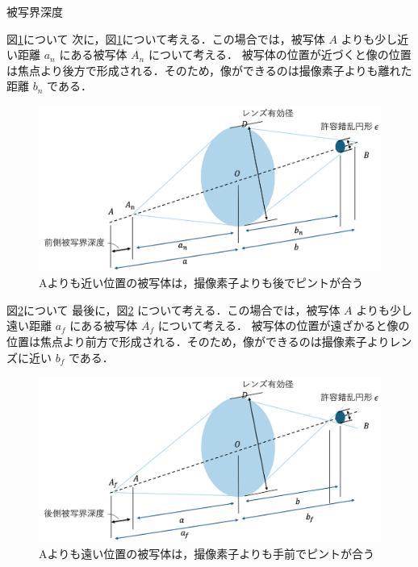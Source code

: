 \documentclass[8pt, jfont=ipaexm, t]{beamer} %
\begin{document}
\begin{frame}[allowframebreaks]{被写界深度}
  \newpage
  \begin{block}{図\ref{fig:b}について}
    次に，図\ref{fig:b}について考える．この場合では，被写体 $A$ よりも少し近い距離 $a_n$ にある被写体 $A_n$ について考える．
    被写体の位置が近づくと像の位置は焦点より後方で形成される．そのため，像ができるのは撮像素子よりも離れた距離 $b_n$ である．
\end{block}
  \begin{figure}[H]
    \centering
    \includegraphics[scale=0.35]{figure/07.png}
    \caption{Aよりも近い位置の被写体は，撮像素子よりも後でピントが合う}
    \label{fig:b}
  \end{figure}
\newpage
  \begin{block}{図\ref{fig:c}について}
    最後に，図\ref{fig:c} について考える．この場合では，被写体 $A$ よりも少し遠い距離 $a_f$ にある被写体 $A_f$ について考える．
    被写体の位置が遠ざかると像の位置は焦点より前方で形成される．そのため，像ができるのは撮像素子よりレンズに近い $b_f$ である．
  \end{block}
  \begin{figure}[H]
    \centering
    \includegraphics[scale=0.35]{figure/08.png}
    \caption{Aよりも遠い位置の被写体は，撮像素子よりも手前でピントが合う}
    \label{fig:c}
  \end{figure}


\end{frame}
\end{document}
